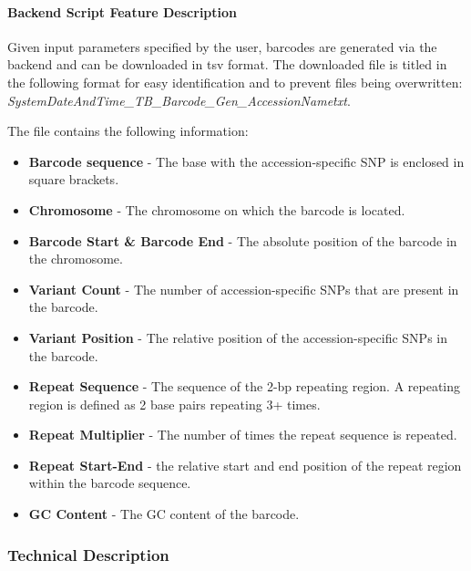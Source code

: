\documentclass[12pt]{article}
\begin{document}
\paragraph{Backend Script Feature Description}
Given input parameters specified by the user, barcodes are generated via the backend and can be downloaded in tsv format. The downloaded file is titled in the following format for easy identification and to prevent files being overwritten: \textit{SystemDateAndTime\_TB\_Barcode\_Gen\_AccessionName\.txt}.

The file contains the following information: 
\begin{itemize}
    \item \textbf{Barcode sequence} - The base with the accession-specific SNP is enclosed in square brackets.
    \item \textbf{Chromosome} - The chromosome on which the barcode is located.
    \item \textbf{Barcode Start \& Barcode End} - The absolute position of the barcode in the chromosome.
    \item \textbf{Variant Count} - The number of accession-specific SNPs that are present in the barcode.
    \item \textbf{Variant Position} - The relative position of the accession-specific SNPs in the barcode. 
    \item \textbf{Repeat Sequence} - The sequence of the 2-bp repeating region. A repeating region is defined as 2 base pairs repeating 3+ times. 
    \item \textbf{Repeat Multiplier} - The number of times the repeat sequence is repeated.
    \item \textbf{Repeat Start-End} - the relative start and end position of the repeat region within the barcode sequence. 
    \item \textbf{GC Content} - The GC content of the barcode. 
\end{itemize}


\subsubsection{Technical Description}
\end{document}
